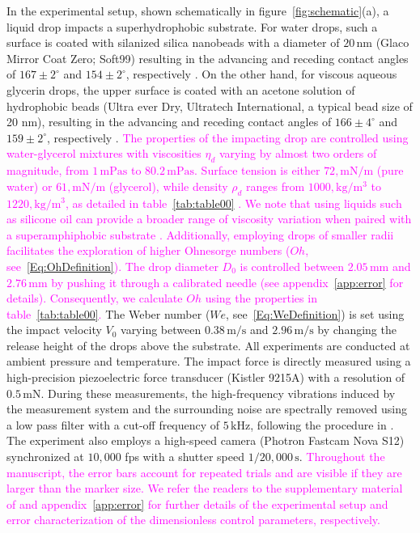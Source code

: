 \documentclass{jfm}
\newcommand{\Rev}[1]{\todo[color=orange, bordercolor=none, textcolor=white]{R2}\textcolor{magenta}{#1}}
\begin{document}
In the experimental setup, shown schematically in figure~\ref{fig:schematic}(a), a liquid drop impacts a superhydrophobic substrate. For water drops, such a surface is coated with silanized silica nanobeads with a diameter of $20\,\si{\nano\meter}$ (Glaco Mirror Coat Zero; Soft99) resulting in the advancing and receding contact angles of $167 \pm 2^{\circ}$ and $154 \pm 2^{\circ}$, respectively \citep{Gauthier2015, Li2017}. On the other hand, for viscous aqueous glycerin drops, the upper surface is coated with an acetone solution of hydrophobic beads (Ultra ever Dry, Ultratech International, a typical bead size of 20 nm), resulting in the advancing and receding contact angles of $166 \pm 4^{\circ}$ and $159 \pm 2^{\circ}$, respectively \citep{Jha2020}. 
\Rev{The properties of the impacting drop are controlled using water-glycerol mixtures with viscosities $\eta_d$ varying by almost two orders of magnitude, from $1\,\si{\milli\pascal}\si{\second}$ to $80.2\,\si{\milli\pascal}\si{\second}$. Surface tension is either $72,\si{\milli\newton}/\si{\meter}$ (pure water) or $61,\si{\milli\newton}/\si{\meter}$ (glycerol), while density $\rho_d$ ranges from $1000,\si{\kilo\gram}/\si{\cubic\meter}$ to $1220,\si{\kilo\gram}/\si{\cubic\meter}$, as detailed in table~\ref{tab:table00} \citep{cheng2008formula, volk2018density, Jha2020}.
We note that using liquids such as silicone oil can provide a broader range of viscosity variation when paired with a superamphiphobic substrate \citep{deng2012candle}. Additionally, employing drops of smaller radii facilitates the exploration of higher Ohnesorge numbers ($Oh$, see~\eqref{Eq:OhDefinition}). 
The drop diameter $D_0$ is controlled between $2.05\,\si{\milli\meter}$ and $2.76\,\si{\milli\meter}$ by pushing it through a calibrated needle (see appendix~\ref{app:error} for details). 
Consequently, we calculate $Oh$ using the properties in table~\ref{tab:table00}.} 
The Weber number ($We$, see~\eqref{Eq:WeDefinition}) is set using the impact velocity $V_0$ varying between $0.38\,\si{\meter}/\si{\second}$ and $2.96\,\si{\meter}/\si{\second}$ by changing the release height of the drops above the substrate. 
All experiments are conducted at ambient pressure and temperature. The impact force is directly measured using a high-precision piezoelectric force transducer (Kistler 9215A) with a resolution of $0.5\,\si{\milli\newton}$. During these measurements, the high-frequency vibrations induced by the measurement system and the surrounding noise are spectrally removed using a low pass filter with a cut-off frequency of $5\,\si{\kilo\hertz}$, following the procedure in \citet{Li2014, Zhang2017, Gordillo2018, Mitchell2019}. 
The experiment also employs a high-speed camera (Photron Fastcam Nova S12) synchronized at $10,000$ fps with a shutter speed $1/20,000\,\si{\second}$. \Rev{Throughout the manuscript, the error bars account for repeated trials and are visible if they are larger than the marker size. We refer the readers to the supplementary material of \citet{zhang2022impact}  and appendix~\ref{app:error} for further details of the experimental setup and error characterization of the dimensionless control parameters, respectively.}
\end{document}
